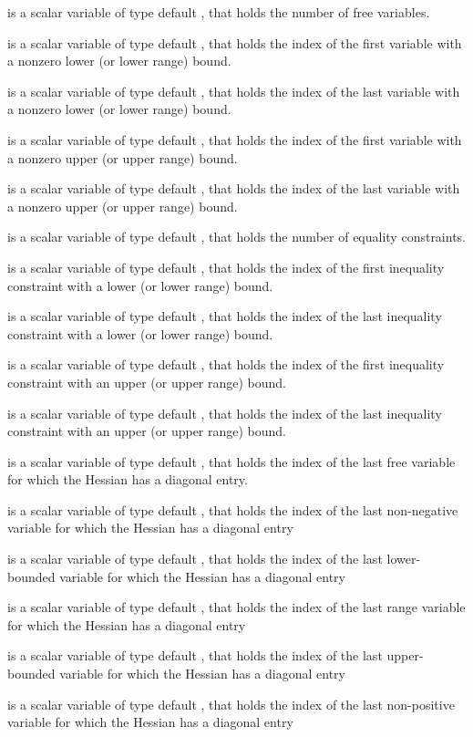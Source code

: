 \documentclass{galahad}
\begin{document}
\begin{description}
 is a scalar variable of type default \integer, that holds the 
number of free variables. 
    
 is a scalar variable of type default \integer, that holds the 
index of the first variable with a nonzero lower (or lower range) bound. 
    
 is a scalar variable of type default \integer, that holds the 
index of the last variable with a nonzero lower (or lower range) bound. 
    
 is a scalar variable of type default \integer, that holds the 
index of the first variable with a nonzero upper (or upper range) bound. 
    
 is a scalar variable of type default \integer, that holds the 
index of the last variable with a nonzero upper (or upper range) bound. 
    
 is a scalar variable of type default \integer, that holds the 
number of equality constraints. 
    
 is a scalar variable of type default \integer, that holds the 
index of the first inequality constraint with a lower (or lower range) bound. 
    
 is a scalar variable of type default \integer, that holds the 
index of the last inequality constraint with a lower (or lower range) bound. 
    
 is a scalar variable of type default \integer, that holds the 
index of the first inequality constraint with an upper (or upper range) bound. 
    
 is a scalar variable of type default \integer, that holds the 
index of the last inequality constraint with an upper (or upper range) bound. 
 
 is a scalar variable of type default \integer, 
that holds the index of the last free variable for which the Hessian has a 
diagonal entry. 
 
 is a scalar variable of type default \integer, 
that holds the index of the last non-negative variable for which 
the Hessian has a diagonal entry 
 
 is a scalar variable of type default \integer, 
that holds the index of the last lower-bounded variable for which the Hessian 
has a diagonal entry 
 
 is a scalar variable of type default \integer, 
that holds the index of the last range variable for which the Hessian has a 
diagonal entry 
 
 is a scalar variable of type default \integer, 
that holds the index of the last upper-bounded variable for which the Hessian 
has a diagonal entry 
 
 is a scalar variable of type default \integer, 
that holds the index of the last non-positive variable for which the Hessian 
has a diagonal entry 
\end{description}
\end{document}

